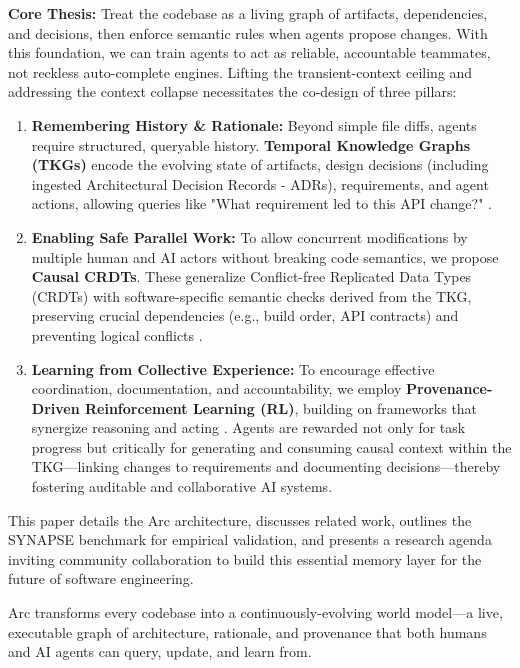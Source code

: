 \documentclass{article}
\begin{document}
\textbf{Core Thesis:} Treat the codebase as a living graph of artifacts, dependencies, and decisions, then enforce semantic rules when agents propose changes. With this foundation, we can train agents to act as reliable, accountable teammates, not reckless auto-complete engines. Lifting the transient-context ceiling and addressing the context collapse necessitates the co-design of three pillars:
\begin{enumerate}
    \item \textbf{Remembering History \& Rationale:} Beyond simple file diffs, agents require structured, queryable history. \textbf{Temporal Knowledge Graphs (TKGs)} encode the evolving state of artifacts, design decisions (including ingested Architectural Decision Records - ADRs), requirements, and agent actions, allowing queries like "What requirement led to this API change?" \cite{ref_zep_gh, ref_letta_gh, ref_letta_blog}.
    \item \textbf{Enabling Safe Parallel Work:} To allow concurrent modifications by multiple human and AI actors without breaking code semantics, we propose \textbf{Causal CRDTs}. These generalize Conflict-free Replicated Data Types (CRDTs) with software-specific semantic checks derived from the TKG, preserving crucial dependencies (e.g., build order, API contracts) and preventing logical conflicts \cite{ref16}.
    \item \textbf{Learning from Collective Experience:} To encourage effective coordination, documentation, and accountability, we employ \textbf{Provenance-Driven Reinforcement Learning (RL)}, building on frameworks that synergize reasoning and acting \cite{ref7, ref40_rlgpt}. Agents are rewarded not only for task progress but critically for generating and consuming causal context within the TKG—linking changes to requirements and documenting decisions—thereby fostering auditable and collaborative AI systems.
\end{enumerate}
This paper details the Arc architecture, discusses related work, outlines the SYNAPSE benchmark for empirical validation, and presents a research agenda inviting community collaboration to build this essential memory layer for the future of software engineering.

\begin{keypoint}
Arc transforms every codebase into a continuously-evolving world model—a live, executable graph of architecture, rationale, and provenance that both humans and AI agents can query, update, and learn from.
\end{keypoint}
\end{document}
